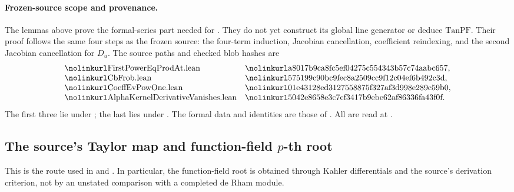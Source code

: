 \paragraph{Frozen-source scope and provenance.}
The lemmas above prove the formal-series part needed for
.
They do not yet construct its global line generator or
deduce \(\mathrm{TanPF}\).
Their proof follows the same four steps as the frozen
source: the four-term induction, Jacobian cancellation,
coefficient reindexing, and the second Jacobian cancellation
for \(D_u\).
The source paths and checked blob hashes are
\[
\begin{array}{ll}
 \srcid{FirstPowerEqProdAt.lean}&
 \srcid{a8017b9ca8fc5ef04275c554343b57c74aabc657},\\
 \srcid{CbFrob.lean}&
 \srcid{575199c90bc9fec8a2509cc9f12c04ef6b492c3d},\\
 \srcid{CoeffEvPowOne.lean}&
 \srcid{01e43128ed3127558875f327af3d998e289c59b0},\\
 \srcid{AlphaKernelDerivativeVanishes.lean}&
 \srcid{5042e8658e3c7cf3417b9ebe62af86336fa43f0f}.
\end{array}
\]
The first three lie under
;
the last lies under
.
The formal data and identities are those of
.
All are read at .

\subsection{The source's Taylor map and function-field \(p\)-th root}
\label{subsec:faithful-taylor-function-field-root}

This is the route used in
 and .
In particular, the function-field root is obtained through
Kahler differentials and the source's derivation criterion,
not by an unstated comparison with a completed de Rham module.

